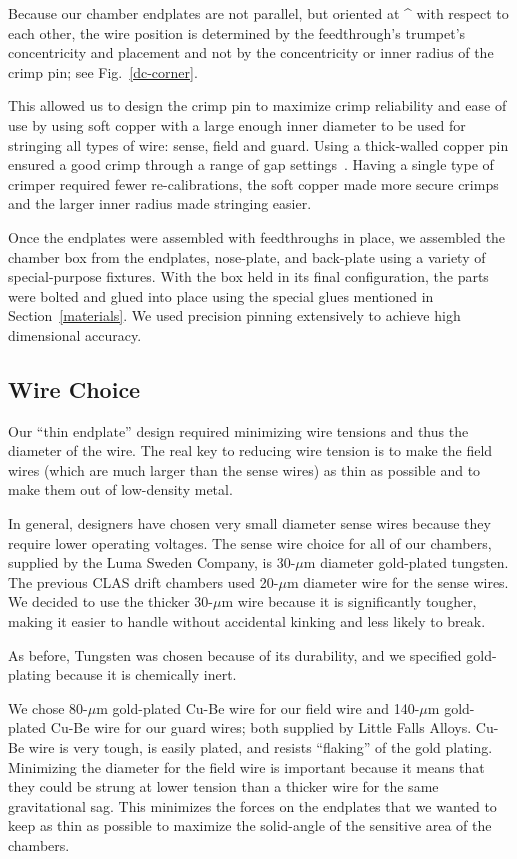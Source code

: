 Because our chamber endplates are not parallel, but oriented at
^{\circ} with respect to each other, the wire position is determined
by the feedthrough's trumpet's concentricity and placement and not by
the concentricity or inner radius of the crimp pin; see Fig.~\ref{dc-corner}.

This allowed us to design the crimp pin to maximize crimp reliability
and ease of use by using soft copper with a large enough inner diameter
to be used for stringing all types of wire: sense, field and guard.
Using a thick-walled copper pin ensured a good crimp through a range of gap settings~\cite{sbc}.
Having a single type of crimper required fewer re-calibrations, the soft
copper made more secure crimps and the larger inner radius made
stringing easier.

Once the endplates were assembled with feedthroughs in place, 
we assembled the chamber box from the
endplates, nose-plate, and back-plate using a variety of special-purpose
fixtures.  With the box held in its final configuration, the parts were bolted
and glued into place using the special glues mentioned in Section~\ref{materials}.
We used precision pinning extensively to achieve high dimensional accuracy.

\subsection{Wire Choice}

Our ``thin endplate'' design required minimizing wire tensions and
thus the diameter of the wire.  The real key to reducing wire tension is to
make the field wires (which are much larger than the sense wires) as 
thin as possible and to make them out of low-density metal.  

In general, designers have chosen very small diameter sense wires because they
require lower operating voltages.
The sense wire choice for all of our chambers, supplied by the Luma
Sweden Company, is 30-$\mu$m diameter gold-plated tungsten.  
The previous CLAS drift chambers used 20-$\mu$m diameter wire for the
sense wires.  We decided to use the thicker 30-$\mu$m wire because it is 
significantly tougher, making it easier to handle without
accidental kinking and less likely to break.

As before, Tungsten was chosen because of its durability, 
and we specified gold-plating because it is chemically inert.  

We chose 80-$\mu$m gold-plated Cu-Be wire for our field wire and
140-$\mu$m gold-plated Cu-Be wire for our guard wires; both supplied
by Little Falls Alloys. Cu-Be wire is very tough, is easily plated, and resists
``flaking'' of the gold plating. 
Minimizing the diameter for the field wire is important because it means that they 
could be strung at lower tension than a thicker wire for the same gravitational sag.  
This minimizes the forces on the endplates that we wanted to keep as 
thin as possible to maximize the solid-angle of the sensitive area of
the chambers.

